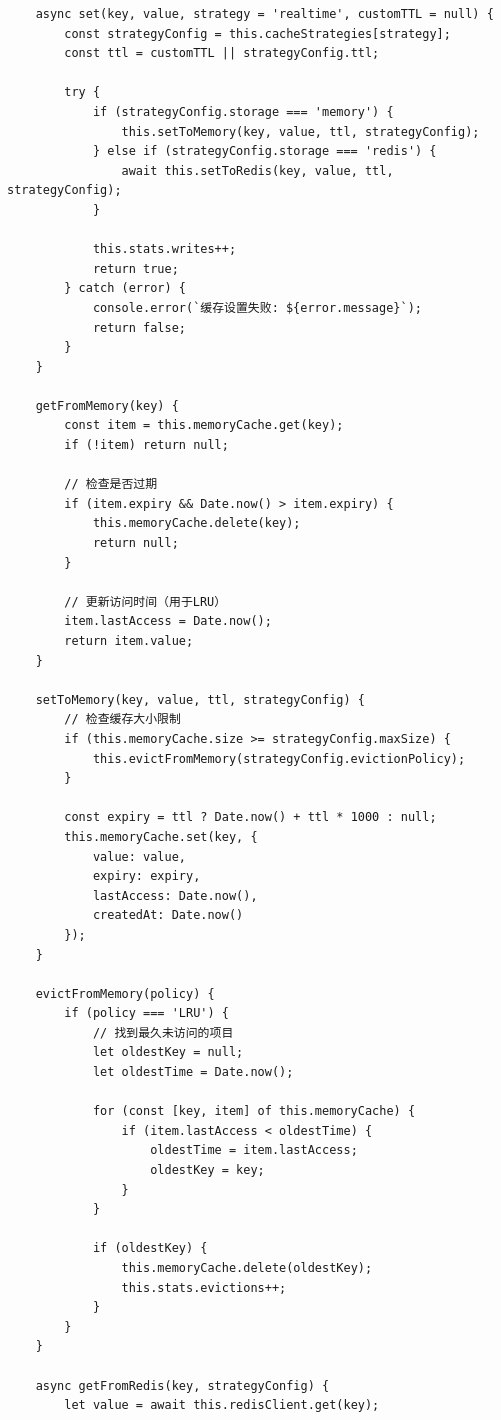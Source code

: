 \begin{lstlisting}
    async set(key, value, strategy = 'realtime', customTTL = null) {
        const strategyConfig = this.cacheStrategies[strategy];
        const ttl = customTTL || strategyConfig.ttl;
        
        try {
            if (strategyConfig.storage === 'memory') {
                this.setToMemory(key, value, ttl, strategyConfig);
            } else if (strategyConfig.storage === 'redis') {
                await this.setToRedis(key, value, ttl, strategyConfig);
            }
            
            this.stats.writes++;
            return true;
        } catch (error) {
            console.error(`缓存设置失败: ${error.message}`);
            return false;
        }
    }
    
    getFromMemory(key) {
        const item = this.memoryCache.get(key);
        if (!item) return null;
        
        // 检查是否过期
        if (item.expiry && Date.now() > item.expiry) {
            this.memoryCache.delete(key);
            return null;
        }
        
        // 更新访问时间（用于LRU）
        item.lastAccess = Date.now();
        return item.value;
    }
    
    setToMemory(key, value, ttl, strategyConfig) {
        // 检查缓存大小限制
        if (this.memoryCache.size >= strategyConfig.maxSize) {
            this.evictFromMemory(strategyConfig.evictionPolicy);
        }
        
        const expiry = ttl ? Date.now() + ttl * 1000 : null;
        this.memoryCache.set(key, {
            value: value,
            expiry: expiry,
            lastAccess: Date.now(),
            createdAt: Date.now()
        });
    }
    
    evictFromMemory(policy) {
        if (policy === 'LRU') {
            // 找到最久未访问的项目
            let oldestKey = null;
            let oldestTime = Date.now();
            
            for (const [key, item] of this.memoryCache) {
                if (item.lastAccess < oldestTime) {
                    oldestTime = item.lastAccess;
                    oldestKey = key;
                }
            }
            
            if (oldestKey) {
                this.memoryCache.delete(oldestKey);
                this.stats.evictions++;
            }
        }
    }
    
    async getFromRedis(key, strategyConfig) {
        let value = await this.redisClient.get(key);
        

\end{lstlisting}
